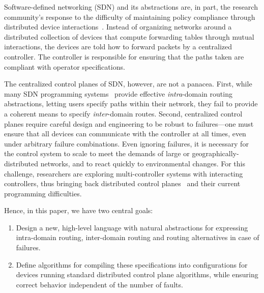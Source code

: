 \documentclass[10pt]{sigalternate052015}
\begin{document}
Software-defined networking (SDN) and its abstractions
are, in part, the research
community's response to the difficulty of maintaining policy
compliance through distributed device interactions~\cite{ethane}. 
Instead of organizing networks around a distributed 
collection of devices that compute forwarding tables through
mutual interactions, the devices are told how to
forward packets by a centralized controller. The controller is responsible for ensuring that the
paths taken are compliant with operator specifications.

The centralized control planes of SDN, however, are not a panacea.
First, while many SDN programming systems~\cite{sdn-languages} provide effective \emph{intra}-domain routing
abstractions, letting users specify paths within their network,
they fail to provide a coherent means to specify \emph{inter}-domain routes.
Second, centralized control planes
require careful design and engineering to be robust to failures---one must ensure that all devices can communicate with the controller at all times, even under arbitrary failure combinations. Even ignoring failures, it is necessary for the control system to
scale to meet the demands of large or geographically-distributed networks,
and to react quickly
to environmental changes. For this challenge, researchers are exploring
multi-controller systems with interacting controllers, thus bringing back distributed
control planes~\cite{mccauley2013extending,onos} and their current programming difficulties.

Hence, in this paper, we have two central goals:
\begin{enumerate}
\item Design a new, high-level language with natural abstractions
for expressing intra-domain routing, inter-domain
routing and routing alternatives in case of failures.
\item Define algorithms for compiling these specifications into
configurations for devices running standard
distributed control plane algorithms, while ensuring correct behavior
independent of the number of faults.
\end{enumerate}
\end{document}

